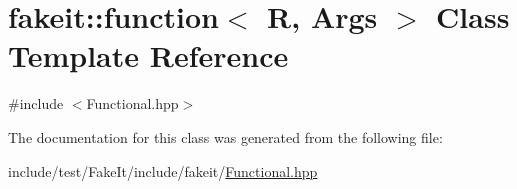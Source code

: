 \hypertarget{classfakeit_1_1function}{}\section{fakeit\+::function$<$ R, Args $>$ Class Template Reference}
\label{classfakeit_1_1function}


{\ttfamily \#include $<$Functional.\+hpp$>$}



The documentation for this class was generated from the following file\+:\begin{DoxyCompactItemize}
\item 
include/test/\+Fake\+It/include/fakeit/\mbox{\hyperlink{Functional_8hpp}{Functional.\+hpp}}\end{DoxyCompactItemize}
